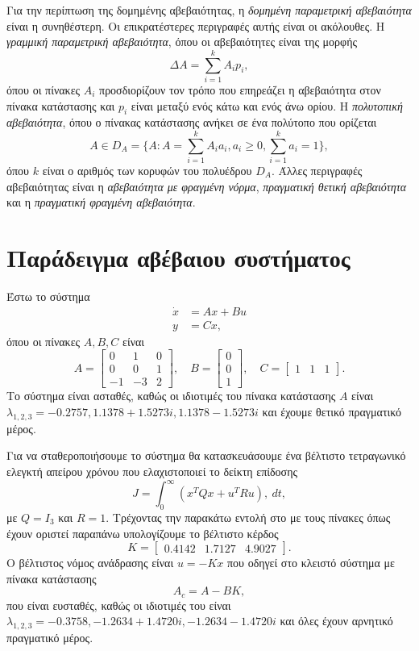 Για την περίπτωση της δομημένης αβεβαιότητας, η
\emph{δομημένη παραμετρική αβεβαιότητα} είναι η συνηθέστερη. Οι επικρατέστερες
περιγραφές αυτής είναι οι ακόλουθες. Η \emph{γραμμική παραμετρική αβεβαιότητα},
όπου οι αβεβαιότητες είναι της μορφής
\[
    \Delta A = \sum_{i = 1}^k A_i p_i,
\]
όπου οι πίνακες \( A_i \) προσδιορίζουν τον τρόπο που επηρεάζει η αβεβαιότητα
στον πίνακα κατάστασης και \( p_i \) είναι μεταξύ ενός κάτω και ενός άνω ορίου.
Η \emph{πολυτοπική αβεβαιότητα}, όπου ο πίνακας κατάστασης ανήκει σε ένα
πολύτοπο που ορίζεται
\[
    A \in D_A = \{ A: A = \sum_{i = 1}^k A_i a_i, a_i \geq 0, \sum_{i = 1}^k a_i =
    1 \},
\]
όπου \( k \) είναι ο αριθμός των κορυφών του πολυέδρου \( D_A \).
Άλλες περιγραφές αβεβαιότητας είναι η \emph{αβεβαιότητα με φραγμένη νόρμα},
\emph{πραγματική θετική αβεβαιότητα} και η \emph{πραγματική φραγμένη
αβεβαιότητα}.

\section{Παράδειγμα αβέβαιου συστήματος}
Έστω το σύστημα
\begin{align*}
    \dot{x} &= Ax + Bu \\
    y &= Cx,
\end{align*}
όπου οι πίνακες \( A, B, C \) είναι
\[
    A =
    \begin{bmatrix}
        0 & 1 & 0 \\
        0 & 0 & 1 \\
        -1 & -3 & 2
    \end{bmatrix}, \quad
    B = \begin{bmatrix}0 \\ 0 \\ 1\end{bmatrix}, \quad
    C = \begin{bmatrix}1 & 1 & 1\end{bmatrix}.
\]
Το σύστημα είναι ασταθές, καθώς οι ιδιοτιμές του πίνακα κατάστασης
\( A \) είναι \( \lambda_{1,2,3} = -0.2757, 1.1378 + 1.5273i, 1.1378
- 1.5273i \) και έχουμε θετικό πραγματικό μέρος.

Για να σταθεροποιήσουμε το σύστημα θα κατασκευάσουμε ένα βέλτιστο τετραγωνικό
ελεγκτή απείρου χρόνου που ελαχιστοποιεί το δείκτη επίδοσης
\[
    J = \int_0^{\infty} \left( x^{T}Qx + u^{T}Ru \right) ,\ dt,
\]
με \( Q = I_3 \) και \( R = 1 \). Τρέχοντας την παρακάτω εντολή στο 
με τους πίνακες όπως έχουν οριστεί παραπάνω
υπολογίζουμε το βέλτιστο κέρδος
\[
    K = \begin{bmatrix}0.4142 & 1.7127 & 4.9027\end{bmatrix}.
\]
Ο βέλτιστος νόμος ανάδρασης είναι \( u = -Kx \) που οδηγεί στο κλειστό σύστημα
με πίνακα κατάστασης
\[
    A_c = A - BK,
\]
που είναι ευσταθές, καθώς οι ιδιοτιμές του είναι
\( \lambda_{1,2,3} = -0.3758, -1.2634 + 1.4720i,
-1.2634 - 1.4720i \) και όλες έχουν αρνητικό πραγματικό μέρος.

